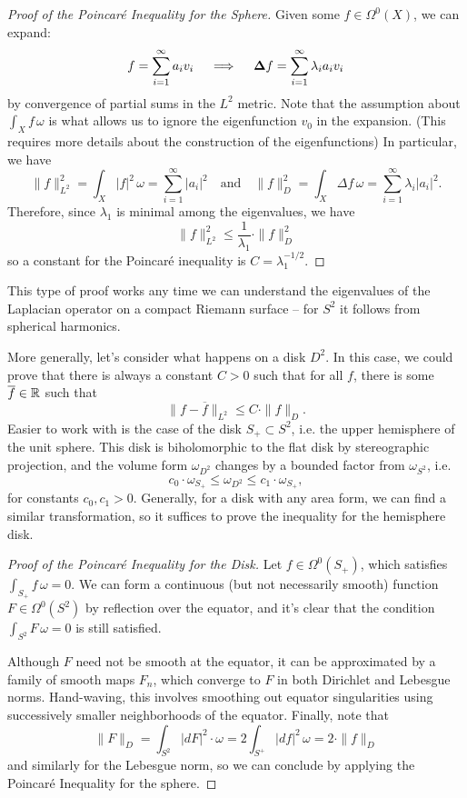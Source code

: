 \documentclass{lkx_paper}
\begin{document}
\begin{proof}[Proof of the Poincar\'e Inequality for the Sphere]
	Given some $f \in \Omega^0(X)$, we can expand:
	\[
		f = \sum^\infty_{i=1} a_i v_i\quad\implies\quad \bm{\Delta} f = \sum^\infty_{i=1} \lambda_i a_i v_i
	\]
	by convergence of partial sums in the $L^2$ metric. Note that the assumption about $\int_X f\, \omega$ is what allows us to ignore the eigenfunction $v_0$ in the expansion. (This requires more details about the construction of the eigenfunctions) In particular, we have
	\[
		\|f\|^2_{L^2} = \int_X |f|^2\,\omega =  \sum^\infty_{i=1}|a_i|^2\quad\textrm{and}\quad \|f\|^2_D = \int_X \Delta f\, \omega = \sum^\infty_{i=1} \lambda_i|a_i|^2.
	\]
	Therefore, since $\lambda_1$ is minimal among the eigenvalues, we have
	\[
		\|f\|^2_{L^2} \leq \frac{1}{\lambda_1}\cdot \|f\|^2_D
	\]
	so a constant for the Poincar\'e inequality is $C = \lambda_1^{-1/2}.$
\end{proof}

This type of proof works any time we can understand the eigenvalues of the Laplacian operator on a compact Riemann surface -- for $S^2$ it follows from spherical harmonics.

More generally, let's consider what happens on a disk $D^2$. In this case, we could prove that there is always a constant $C>0$ such that for all $f$, there is some $\overline{f}\in \mathbb{R}$ such that
\[
	\|f-\overline{f}\|_{L^2} \leq C\cdot \|f\|_D.
\]
Easier to work with is the case of the disk $S_+ \subset S^2$, i.e. the upper hemisphere of the unit sphere. This disk is biholomorphic to the flat disk by stereographic projection, and the volume form $\omega_{D^2}$ changes by a bounded factor from $\omega_{S^2}$, i.e.
\[
	c_0\cdot \omega_{S_+} \leq \omega_{D^2}\leq c_1\cdot \omega_{S_+},
\]
for constants $c_0, c_1>0$. Generally, for a disk with any area form, we can find a similar transformation, so it suffices to prove the inequality for the hemisphere disk.

\begin{proof}[Proof of the Poincar\'e Inequality for the Disk]
	Let $f \in \Omega^0(S_+)$, which satisfies $\int_{S_+} f\,\omega = 0$. We can form a continuous (but not necessarily smooth) function $F \in \Omega^0(S^2)$ by reflection over the equator, and it's clear that the condition $\int_{S^2} F\,\omega=0$ is still satisfied.

	Although $F$ need not be smooth at the equator, it can be approximated by a family of smooth maps $F_n$, which converge to $F$ in both Dirichlet and Lebesgue norms. Hand-waving, this involves smoothing out equator singularities using successively smaller neighborhoods of the equator. Finally, note that
	\[
		\|F\|_D = \int_{S^2} |dF|^2\cdot \omega = 2\int_{S^+} |df|^2\,\omega = 2\cdot \|f\|_D
	\]
	and similarly for the Lebesgue norm, so we can conclude by applying the Poincar\'e Inequality for the sphere.
\end{proof}
\end{document}
